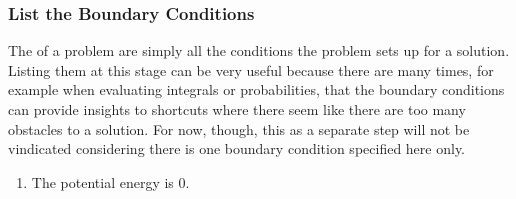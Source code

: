 \subsubsection*{List the Boundary Conditions}
The  of a problem are simply all the conditions the problem sets up for a solution. Listing them at this stage can be very useful because there are many times, for example when evaluating integrals or probabilities, that the boundary conditions can provide insights to shortcuts where there seem like there are too many obstacles to a solution. For now, though, this as a separate step will not be vindicated considering there is one boundary condition specified here only.
\begin{enumerate}
    \item The potential energy is $0$.
\end{enumerate}
